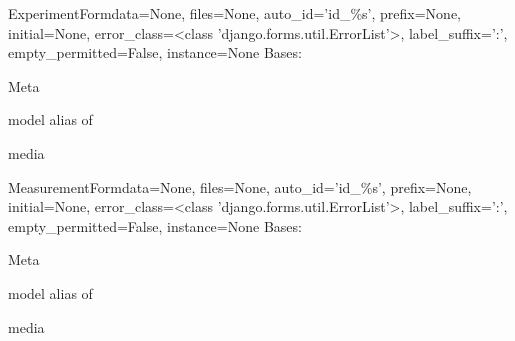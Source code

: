 \documentclass[letterpaper,10pt,english]{sphinxmanual}
\begin{document}
\hypertarget{data.forms.ExperimentForm}{}\begin{classdesc}{ExperimentForm}{data=None, files=None, auto\_id='id\_\%s', prefix=None, initial=None, error\_class=\textless{}class 'django.forms.util.ErrorList'\textgreater{}, label\_suffix=':', empty\_permitted=False, instance=None}
Bases: 

\hypertarget{data.forms.ExperimentForm.Meta}{}\begin{classdesc}{Meta}{}~

\hypertarget{data.forms.ExperimentForm.Meta.model}{}\begin{memberdesc}{model}
alias of 
\end{memberdesc}
\end{classdesc}

\hypertarget{data.forms.ExperimentForm.media}{}\begin{memberdesc}[ExperimentForm]{media}\end{memberdesc}
\end{classdesc}

\hypertarget{data.forms.MeasurementForm}{}\begin{classdesc}{MeasurementForm}{data=None, files=None, auto\_id='id\_\%s', prefix=None, initial=None, error\_class=\textless{}class 'django.forms.util.ErrorList'\textgreater{}, label\_suffix=':', empty\_permitted=False, instance=None}
Bases: 

\hypertarget{data.forms.MeasurementForm.Meta}{}\begin{classdesc}{Meta}{}~

\hypertarget{data.forms.MeasurementForm.Meta.model}{}\begin{memberdesc}{model}
alias of 
\end{memberdesc}
\end{classdesc}

\hypertarget{data.forms.MeasurementForm.media}{}\begin{memberdesc}[MeasurementForm]{media}\end{memberdesc}
\end{classdesc}
\end{document}
